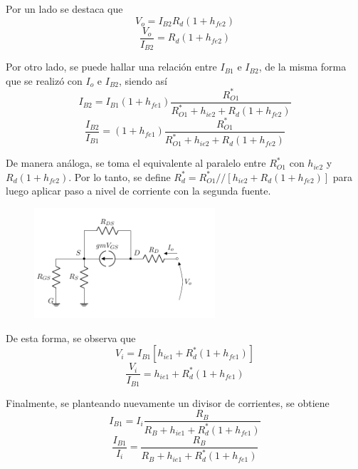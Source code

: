 Por un lado se destaca que 
\begin{equation*}
	V_o = I_{B2} R_d \left( 1 + h_{fe2} \right)
\end{equation*}
\begin{equation}
	\frac{V_o}{I_{B2}} = R_d \left( 1 + h_{fe2} \right)
\label{equ:vo-ib2}
\end{equation}

Por otro lado, se puede hallar una relación entre $I_{B1}$ e $I_{B2}$, de la misma forma que se realizó con $I_o$ e $I_{B2}$, siendo así
\begin{equation*}
	I_{B2} = I_{B1} \left( 1 + h_{fe1} \right) \frac{R_{O1}^{*}}{ R_{O1}^{*} + h_{ie2} + R_d \left( 1 + h_{fe2} \right) }
\end{equation*}
\begin{equation}
	\frac{I_{B2}}{I_{B1}} = \left( 1 + h_{fe1} \right) \frac{R_{O1}^{*}}{ R_{O1}^{*} + h_{ie2} + R_d \left( 1 + h_{fe2} \right) }
	\label{equ:ib2-ib1}
\end{equation}

De manera análoga, se toma el equivalente al paralelo entre $R_{O1}^{*}$ con $h_{ie2}$ y $R_d \left( 1 + h_{fe2} \right)$. Por lo tanto, se define $R_{d}^* = R_{O1}^{*} // \left[ h_{ie2} + R_d \left( 1 + h_{fe2} \right) \right]$ para luego aplicar paso a nivel de corriente con la segunda fuente.
\begin{figure}[H]
\centering
	\includegraphics[width=0.6\textwidth, page=6]{Imagenes/ModeloIncremental.pdf}
\end{figure}

De esta forma, se observa que
\begin{equation*}
	V_i = I_{B1} \left[ h_{ie1} + R_{d}^* \left( 1 + h_{fe1} \right) \right]
\end{equation*}
\begin{equation}
	\frac{V_i}{I_{B1}} = h_{ie1} + R_{d}^* \left( 1 + h_{fe1} \right)
	\label{equ:vi-ib1}
\end{equation}

Finalmente, se planteando nuevamente un divisor de corrientes, se obtiene
\begin{equation*}
	I_{B1} = I_i \frac{R_B}{R_B + h_{ie1} + R_{d}^* \left(1 + h_{fe1} \right)}
\end{equation*}
\begin{equation}
	\frac{I_{B1}}{I_i} = \frac{R_B}{R_B + h_{ie1} + R_{d}^* \left(1 + h_{fe1} \right)}
	\label{equ:ib1-ii}
\end{equation}

